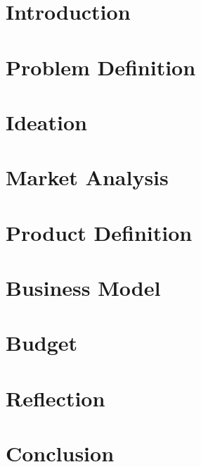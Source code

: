 \documentclass[11pt, a4paper]{article}
\begin{document}
\setcounter{page}{1}
\begin{multicols}{2}



\section{Introduction}
\label{sec:intro}


\section{Problem Definition}
\label{sec:problemDefinition}


\section{Ideation}
\label{sec:ideation}


\section{Market Analysis}
\label{sec:marketanlysis}


\section{Product Definition}
\label{sec:productDefinition}


\section{Business Model}
\label{sec:businessModel}


\section{Budget}
\label{sec:budget}


\section{Reflection}
\label{sec:reflection}


\section{Conclusion}
\label{sec:conclusion}

\label{end}

\end{multicols}
\end{document}
